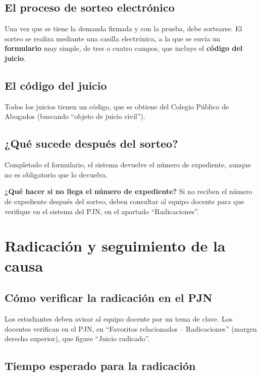 \documentclass[12pt,oneside]{book}
\begin{document}
\subsection{El proceso de sorteo electrónico}

Una vez que se tiene la demanda firmada y con la prueba, debe sortearse. El sorteo se realiza mediante una casilla electrónica, a la que se envía un \textbf{formulario} muy simple, de tres o cuatro campos, que incluye el \textbf{código del juicio}.

\subsection{El código del juicio}

Todos los juicios tienen un código, que se obtiene del Colegio Público de Abogados (buscando ``objeto de juicio civil'').

\subsection{¿Qué sucede después del sorteo?}

Completado el formulario, el sistema devuelve el número de expediente, aunque no es obligatorio que lo devuelva.

\begin{important}
\textbf{¿Qué hacer si no llega el número de expediente?} Si no reciben el número de expediente después del sorteo, deben consultar al equipo docente para que verifique en el sistema del PJN, en el apartado ``Radicaciones''.
\end{important}

\section{Radicación y seguimiento de la causa}

\subsection{Cómo verificar la radicación en el PJN}

Los estudiantes deben avisar al equipo docente por un tema de clave. Los docentes verifican en el PJN, en ``Favoritos relacionados -- Radicaciones'' (margen derecho superior), que figure ``Juicio radicado''.

\subsection{Tiempo esperado para la radicación}
\end{document}
